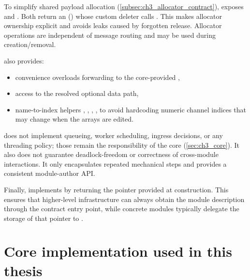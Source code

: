 To simplify shared payload allocation (\autoref{subsec:ch3_allocator_contract}),  exposes  and . Both return an  () whose custom deleter calls . This makes allocator ownership explicit and avoids leaks caused by forgotten release. Allocator operations are independent of message routing and may be used during creation/removal.

 also provides:
\begin{itemize}
    \item {} convenience overloads forwarding to the core-provided ,
    \item {} access to the resolved optional data path,
    \item name-to-index helpers , , , , to avoid hardcoding numeric channel indices that may change when the  arrays are edited.
\end{itemize}

 does not implement queueing, worker scheduling, ingress decisions, or any threading policy; those remain the responsibility of the core (\autoref{sec:ch3_core}). It also does not guarantee deadlock-freedom or correctness of cross-module interactions. It only encapsulates repeated mechanical steps and provides a consistent module-author API.

Finally,  implements  by returning the  pointer provided at construction. This ensures that higher-level infrastructure can always obtain the module description through the contract entry point, while concrete modules typically delegate the storage of that pointer to .





\section{Core implementation used in this thesis} \label{sec:ch3_core}


